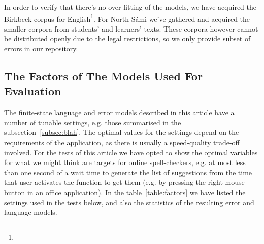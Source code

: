 \documentclass[a4paper,12pt]{article}
\begin{document}
In order to verify that there's no over-fitting of the models, we have acquired
the Birkbeck corpus for English\footnote{}. For North
Sámi we've gathered and acquired the smaller corpora from students' and
learners' texts.  These corpora however cannot be distributed openly due to the
legal restrictions, so we only provide subset of errors in our
repository.

\subsection{The Factors of The Models Used For Evaluation}

The finite-state language and error models described in this article have a
number of tunable settings, e.g. those summarised in the 
subsection~\ref{subsec:blah}. The optimal values for the settings depend on
the requirements of the application, as there is usually a speed-quality
trade-off involved. For the tests of this article we have opted to show the
optimal variables for what we might think are targets for online
spell-checkers, e.g. at most less than one second of a wait time to generate
the list of suggestions from the time that user activates the function to
get them (e.g. by pressing the right mouse button in an office application).
In the table~\ref{table:factors} we have listed the settings used in the
tests below, and also the statistics of the resulting error and language models.
\end{document}
